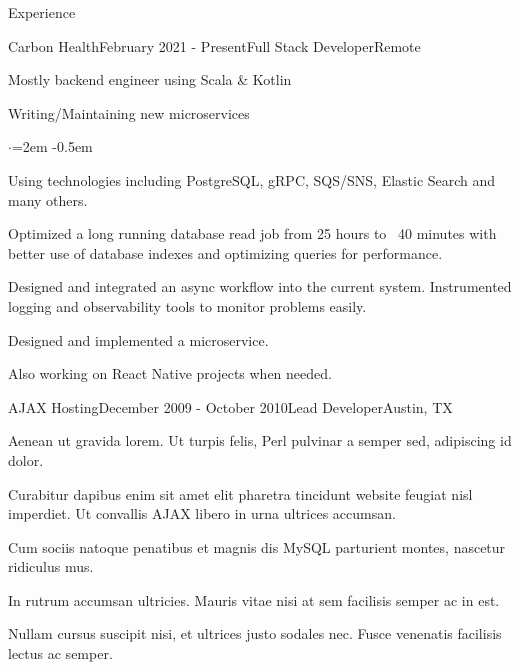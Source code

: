\documentclass{resume} %
\begin{document}
\begin{rSection}{Experience}

\begin{rSubsection}{Carbon Health}{February 2021 - Present}{Full Stack Developer}{Remote}
\item Mostly backend engineer using Scala \& Kotlin
\item Writing/Maintaining new microservices
\begin{list}{$\cdot$}{\leftmargin=2em}
\itemsep -0.5em \vspace{-0.5em} %
    \item Using technologies including PostgreSQL, gRPC, SQS/SNS, Elastic Search and many others.
    \item Optimized a long running database read job from 25 hours to ~40 minutes with better use of database indexes and optimizing queries for performance.
    \item Designed and integrated an async workflow into the current system. Instrumented logging and observability tools to monitor problems easily.
    \item Designed and implemented a microservice.    
\end{list}
\item Also working on React Native projects when needed.
\end{rSubsection}


\begin{rSubsection}{AJAX Hosting}{December 2009 - October 2010}{Lead Developer}{Austin, TX}
\item Aenean ut gravida lorem. Ut turpis felis, Perl pulvinar a semper sed, adipiscing id dolor.
\item Curabitur dapibus enim sit amet elit pharetra tincidunt website feugiat nisl imperdiet. Ut convallis AJAX libero in urna ultrices accumsan.
\item Cum sociis natoque penatibus et magnis dis MySQL parturient montes, nascetur ridiculus mus.
\item In rutrum accumsan ultricies. Mauris vitae nisi at sem facilisis semper ac in est.
\item Nullam cursus suscipit nisi, et ultrices justo sodales nec. Fusce venenatis facilisis lectus ac semper.
\end{rSubsection}



\end{rSection}
\end{document}
